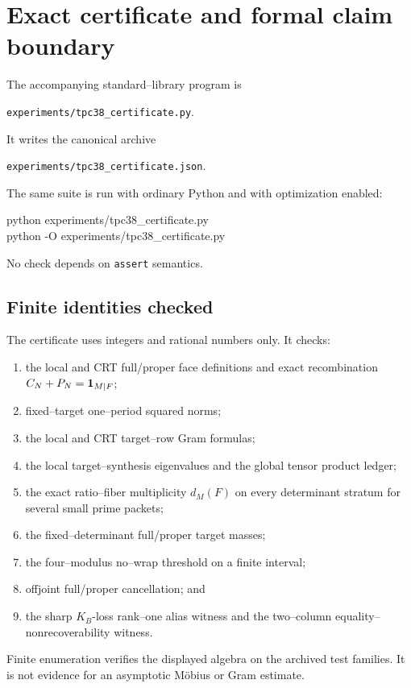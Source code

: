 \section{Exact certificate and formal claim boundary}
\label{sec:tpc38-certificate-claims}

The accompanying standard--library program is
\begin{center}
 \texttt{experiments/tpc38\_certificate.py}.
\end{center}
It writes the canonical archive
\begin{center}
 \texttt{experiments/tpc38\_certificate.json}.
\end{center}
The same suite is run with ordinary Python and with optimization enabled:
\begin{center}
\begin{minipage}{0.58\textwidth}
\ttfamily
python experiments/tpc38\_certificate.py\\
python -O experiments/tpc38\_certificate.py
\end{minipage}
\end{center}
No check depends on \texttt{assert} semantics.

\subsection{Finite identities checked}

The certificate uses integers and rational numbers only.  It checks:
\begin{enumerate}[label=(\roman*)]
 \item the local and CRT full/proper face definitions and exact
 recombination \(C_N+P_N=\mathbf 1_{M\mid F}\);
 \item fixed--target one--period squared norms;
 \item the local and CRT target--row Gram formulas;
 \item the local target--synthesis eigenvalues and the global tensor
 product ledger;
 \item the exact ratio--fiber multiplicity \(d_M(F)\) on every determinant
 stratum for several small prime packets;
 \item the fixed--determinant full/proper target masses;
 \item the four--modulus no--wrap threshold on a finite interval;
 \item offjoint full/proper cancellation; and
 \item the sharp \(K_B\)-loss rank--one alias witness and the two--column
 equality--nonrecoverability witness.
\end{enumerate}
Finite enumeration verifies the displayed algebra on the archived test
families.  It is not evidence for an asymptotic M\"obius or Gram estimate.

